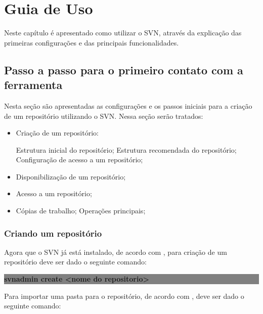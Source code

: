 \chapter[Guia de Uso]{Guia de Uso}

Neste capítulo é apresentado como utilizar o SVN, através da explicação das primeiras configurações e das principais funcionalidades.

\section{Passo a passo para o primeiro contato com a ferramenta}

Nesta seção são apresentadas as configurações e os passos iniciais para a criação de um repositório utilizando o SVN. Nessa seção serão tratados:

\begin{itemize}

\item Criação de um repositório:

  \subitem Estrutura inicial do repositório;
  \subitem Estrutura recomendada do repositório;
  \subitem Configuração de acesso a um repositório;

\item Disponibilização de um repositório;

\item Acesso a um repositório;

\item Cópias de trabalho;
    \subitem Operações principais;

\end{itemize}

\subsection{Criando um repositório}

Agora que o SVN já está instalado, de acordo com , para criação de um repositório deve ser dado o seguinte comando:

\begin{centering}

\colorbox{Gray}{
\begin{minipage}{250px}
  \textbf{svnadmin create <nome do repositorio>}

\end{minipage}
}
\end{centering}

Para importar uma pasta para o repositório, de acordo com , deve ser dado o seguinte comando:


